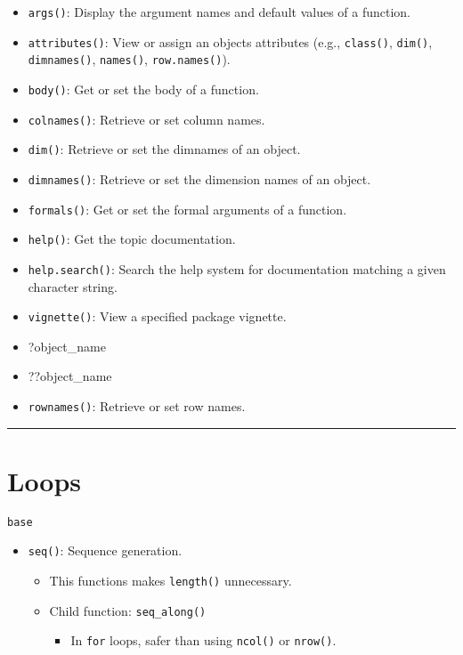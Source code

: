 \documentclass[]{book}
\providecommand{\tightlist}{%
  \setlength{\itemsep}{0pt}\setlength{\parskip}{0pt}}
\begin{document}
\begin{itemize}
\tightlist
\item
  \texttt{args()}: Display the argument names and default values of a function.
\item
  \texttt{attributes()}: View or assign an objects attributes (e.g., \texttt{class()}, \texttt{dim()}, \texttt{dimnames()}, \texttt{names()}, \texttt{row.names()}).
\item
  \texttt{body()}: Get or set the body of a function.
\item
  \texttt{colnames()}: Retrieve or set column names.
\item
  \texttt{dim()}: Retrieve or set the dimnames of an object.
\item
  \texttt{dimnames()}: Retrieve or set the dimension names of an object.
\item
  \texttt{formals()}: Get or set the formal arguments of a function.
\item
  \texttt{help()}: Get the topic documentation.
\item
  \texttt{help.search()}: Search the help system for documentation matching a given character string.
\item
  \texttt{vignette()}: View a specified package vignette.
\item
  ?object\_name
\item
  ??object\_name
\item
  \texttt{rownames()}: Retrieve or set row names.
\end{itemize}

\begin{center}\rule{0.5\linewidth}{\linethickness}\end{center}

\hypertarget{loops}{%
\section{Loops}\label{loops}}

\texttt{base}

\begin{itemize}
\tightlist
\item
  \texttt{seq()}: Sequence generation.

  \begin{itemize}
  \tightlist
  \item
    This functions makes \texttt{length()} unnecessary.
  \item
    Child function: \texttt{seq\_along()}

    \begin{itemize}
    \tightlist
    \item
      In \texttt{for} loops, safer than using \texttt{ncol()} or \texttt{nrow()}.
    \end{itemize}
  \end{itemize}
\end{itemize}
\end{document}
